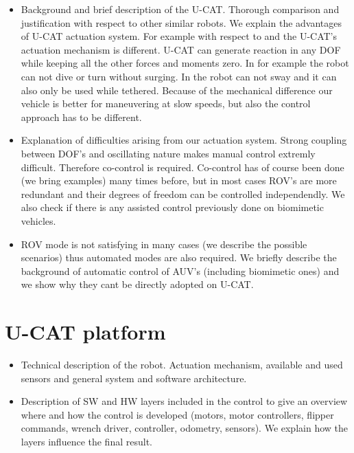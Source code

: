 \documentclass[conference]{IEEEtran}
\begin{document}
\begin{itemize}
	\item Background and brief description of the U-CAT. Thorough comparison and justification with respect to other similar robots. We explain the advantages of U-CAT actuation system. For example with respect to \cite{geder2013maneuvering} and \cite{plamondon2013adaptive} the U-CAT's actuation mechanism is different. U-CAT can generate reaction in any DOF while keeping all the other forces and moments zero. In \cite{geder2013maneuvering} for example the robot can not dive or turn without surging. In \cite{plamondon2013adaptive} the robot can not sway and it can also only be used while tethered. Because of the mechanical difference our vehicle is better for maneuvering at slow speeds, but also the control approach has to be different. 
	\item Explanation of difficulties arising from our actuation system. 
Strong coupling between DOF's and oscillating nature makes manual control extremly difficult. 
Therefore co-control is required. 
Co-control has of course been done (we bring examples) many times before, but in most cases ROV's are more redundant and their degrees of freedom can be controlled independendly. We also check if there is any assisted control previously done on biomimetic vehicles.
	\item ROV mode is not satisfying in many cases (we describe the possible scenarios) thus automated modes are also required. 
We briefly describe the background of automatic control of AUV's (including biomimetic ones) and we show why they cant be directly adopted on U-CAT.
\end{itemize}




\section{U-CAT platform}

\begin{itemize}
	\item
Technical description of the robot. 
Actuation mechanism, available and used sensors and general system and software architecture.
	\item
Description of SW and HW layers included in the control to give an overview where and how the control is developed (motors, motor controllers, flipper commands, wrench driver, controller, odometry, sensors).
We explain how the layers influence the final result.
\end{itemize}
\end{document}
